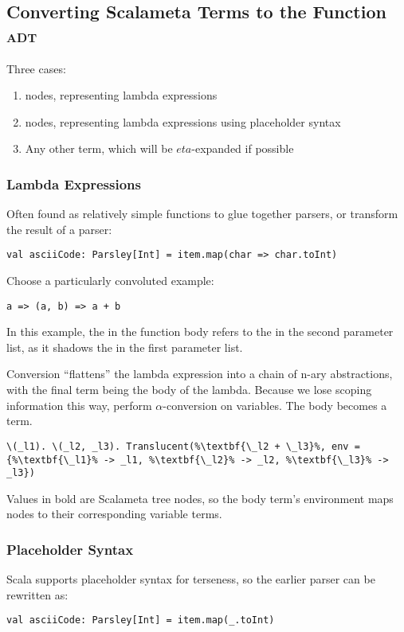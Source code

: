 \documentclass[../../main.tex]{subfiles}
\begin{document}
\subsection{Converting Scalameta Terms to the Function \textsc{adt}}
Three cases:
\begin{enumerate}
    \item {} nodes, representing lambda expressions
    \item {} nodes, representing lambda expressions using placeholder syntax
    \item Any other term, which will be $eta$-expanded if possible
\end{enumerate}

\subsubsection{Lambda Expressions}
Often found as relatively simple functions to glue together parsers, or transform the result of a parser:
\begin{verbatim}
val asciiCode: Parsley[Int] = item.map(char => char.toInt)
\end{verbatim}

Choose a particularly convoluted example:
\begin{verbatim}
a => (a, b) => a + b
\end{verbatim}
In this example, the  in the function body refers to the  in the second parameter list, as it shadows the  in the first parameter list.

Conversion ``flattens'' the lambda expression into a chain of n-ary abstractions, with the final term being the body of the lambda.
Because we lose scoping information this way, perform $\alpha$-conversion on variables.
The body becomes a  term.

\begin{lstlisting}
\(_l1). \(_l2, _l3). Translucent(%\textbf{\_l2 + \_l3}%, env = {%\textbf{\_l1}% -> _l1, %\textbf{\_l2}% -> _l2, %\textbf{\_l3}% -> _l3})
\end{lstlisting}
Values in bold are Scalameta tree nodes, so the body term's environment maps  nodes to their corresponding variable terms.

\subsubsection{Placeholder Syntax}
Scala supports placeholder syntax for terseness, so the earlier parser can be rewritten as:
\begin{verbatim}
val asciiCode: Parsley[Int] = item.map(_.toInt)
\end{verbatim}
\end{document}
